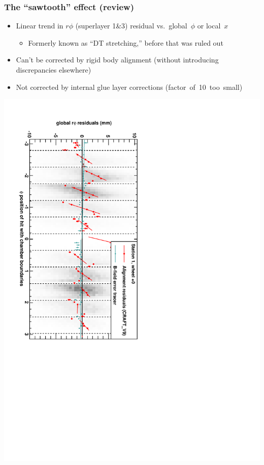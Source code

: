 \documentclass[compress]{beamer}
\begin{document}
\begin{frame}
\frametitle{The ``sawtooth'' effect (review)}

\begin{itemize}
\item Linear trend in $r\phi$ (superlayer 1\&3) residual vs.~global~$\phi$ or local~$x$
\begin{itemize}
\item Formerly known as ``DT stretching,'' before that was ruled out
\end{itemize}
\item Can't be corrected by rigid body alignment (without introducing discrepancies elsewhere)
\item Not corrected by internal glue layer corrections \mbox{(factor of 10 too small)\hspace{-1 cm}}
\end{itemize}

\includegraphics[height=0.9\linewidth, angle=90]{DTrphiVsPhi_st1_whC.pdf}
\end{frame}
\end{document}
